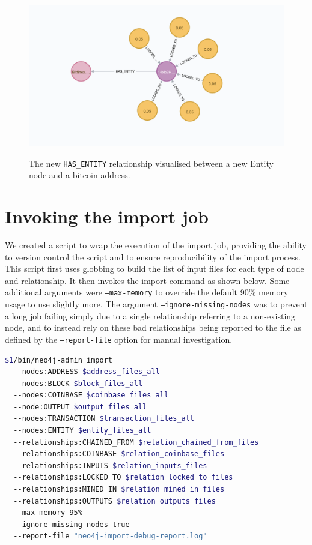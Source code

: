 \begin{figure}[h!]
  \centering
  \includegraphics[width = 15cm]{./figures/has-entity-relationship}\\[0.5cm] 
  \caption{The new \texttt{HAS\_ENTITY} relationship visualised between a new Entity node and a bitcoin address.}
  \label{fig:neo4j-has-entity}
\end{figure}

\section{Invoking the import job}
We created a script to wrap the execution of the import job, providing the ability to version control the script and to ensure reproducibility of the import process. This script first uses globbing to build the list of input files for each type of node and relationship. It then invokes the import command as shown below. Some additional arguments were \texttt{--max-memory} to override the default 90\% memory usage to use slightly more. The argument \texttt{--ignore-missing-nodes} was to prevent a long job failing simply due to a single relationship referring to a non-existing node, and to instead rely on these bad relationships being reported to the file as defined by the \texttt{--report-file} option for manual investigation. 

\begin{lstlisting}[language=Bash]
$1/bin/neo4j-admin import 
  --nodes:ADDRESS $address_files_all
  --nodes:BLOCK $block_files_all
  --nodes:COINBASE $coinbase_files_all
  --node:OUTPUT $output_files_all
  --nodes:TRANSACTION $transaction_files_all 
  --nodes:ENTITY $entity_files_all
  --relationships:CHAINED_FROM $relation_chained_from_files 
  --relationships:COINBASE $relation_coinbase_files 
  --relationships:INPUTS $relation_inputs_files 
  --relationships:LOCKED_TO $relation_locked_to_files 
  --relationships:MINED_IN $relation_mined_in_files 
  --relationships:OUTPUTS $relation_outputs_files 
  --max-memory 95% 
  --ignore-missing-nodes true 
  --report-file "neo4j-import-debug-report.log" 
\end{lstlisting}

